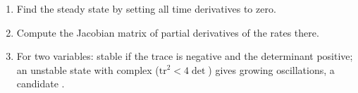 \begin{method}\label{met:b3:complex-kinetics:stability}
\begin{enumerate}
  \item Find the steady state by setting all time derivatives to zero.
  \item Compute the Jacobian matrix of partial derivatives of the rates there.
  \item For two variables: stable if the trace is negative and the determinant
        positive; an unstable state with complex 
        ($\mathrm{tr}^2 < 4\det$) gives growing oscillations, a candidate .
\end{enumerate}
\end{method}


